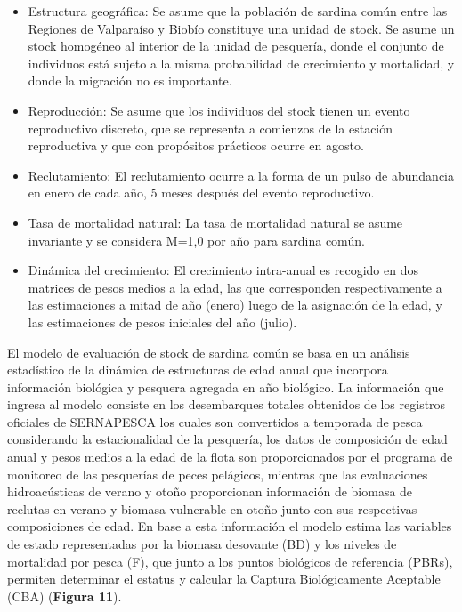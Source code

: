 \documentclass[
  spanish,
]{article}
\providecommand{\tightlist}{%
  \setlength{\itemsep}{0pt}\setlength{\parskip}{0pt}}
\begin{document}
\begin{itemize}
\tightlist
\item
  Estructura geográfica: Se asume que la población de sardina común
  entre las Regiones de Valparaíso y Biobío constituye una unidad de
  stock. Se asume un stock homogéneo al interior de la unidad de
  pesquería, donde el conjunto de individuos está sujeto a la misma
  probabilidad de crecimiento y mortalidad, y donde la migración no es
  importante.
\item
  Reproducción: Se asume que los individuos del stock tienen un evento
  reproductivo discreto, que se representa a comienzos de la estación
  reproductiva y que con propósitos prácticos ocurre en agosto.
\item
  Reclutamiento: El reclutamiento ocurre a la forma de un pulso de
  abundancia en enero de cada año, 5 meses después del evento
  reproductivo.
\item
  Tasa de mortalidad natural: La tasa de mortalidad natural se asume
  invariante y se considera M=1,0 por año para sardina común.
\item
  Dinámica del crecimiento: El crecimiento intra-anual es recogido en
  dos matrices de pesos medios a la edad, las que corresponden
  respectivamente a las estimaciones a mitad de año (enero) luego de la
  asignación de la edad, y las estimaciones de pesos iniciales del año
  (julio).
\end{itemize}

El modelo de evaluación de stock de sardina común se basa en un análisis
estadístico de la dinámica de estructuras de edad anual que incorpora
información biológica y pesquera agregada en año biológico. La
información que ingresa al modelo consiste en los desembarques totales
obtenidos de los registros oficiales de SERNAPESCA los cuales son
convertidos a temporada de pesca considerando la estacionalidad de la
pesquería, los datos de composición de edad anual y pesos medios a la
edad de la flota son proporcionados por el programa de monitoreo de las
pesquerías de peces pelágicos, mientras que las evaluaciones
hidroacústicas de verano y otoño proporcionan información de biomasa de
reclutas en verano y biomasa vulnerable en otoño junto con sus
respectivas composiciones de edad. En base a esta información el modelo
estima las variables de estado representadas por la biomasa desovante
(BD) y los niveles de mortalidad por pesca (F), que junto a los puntos
biológicos de referencia (PBRs), permiten determinar el estatus y
calcular la Captura Biológicamente Aceptable (CBA) (\textbf{Figura 11}).
\end{document}
